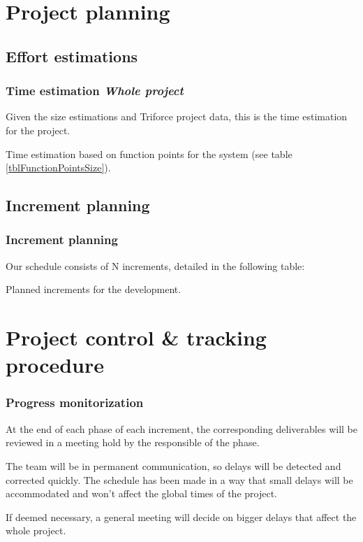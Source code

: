 \documentclass[10pt, compress,usetitleprogressbar,aspectratio=1610]{beamer}
\begin{document}
\section{Project planning}

\subsection{Effort estimations}
\begin{frame}
\frametitle{Time estimation \hfill \emph{Whole project}}
Given the size estimations and Triforce project data, this is the time estimation for the project.

\begin{table}[hbtp]
\centering

\caption{Time estimation based on function points for the system (see table \ref{tblFunctionPointsSize}).}
\label{tblFunctionPointsTime}
\end{table}
\end{frame}



\subsection{Increment planning}
\begin{frame}
\frametitle{Increment planning}

Our schedule consists of N increments, detailed in the following table:

\begin{table}[hbtp]
\centering

\caption{Planned increments for the development.}
\label{tblIncrements}
\end{table}
\end{frame}

\section{Project control \& tracking procedure}

\begin{frame}
\frametitle{Progress monitorization}
At the end of each phase of each increment, the corresponding deliverables will be reviewed in a meeting hold by the responsible of the phase.

The team will be in permanent communication, so delays will be detected and corrected quickly. The schedule has been made in a way that small delays will be accommodated and won't affect the global times of the project.

If deemed necessary, a general meeting will decide on bigger delays that affect the whole project.
\end{frame}
\end{document}
